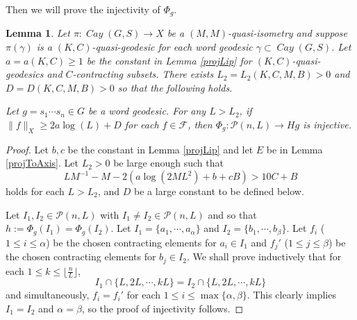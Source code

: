 \documentclass{amsart}
\numberwithin{thm}{section}
\numberwithin{figure}{section}
\newtheorem{lem}[thm]{Lemma}
\theoremstyle{definition}
\theoremstyle{definition}
\theoremstyle{remark}
\numberwithin{equation}{section}
\DeclareMathOperator{\Cay}{\mathit{Cay}}
\theoremstyle{plain}
\begin{document}
Then we will prove the injectivity of $\Phi_g$.
\begin{lem}\label{extInj}
	Let $\pi: \Cay (G, S)\to X$ be a $(M, M)$-quasi-isometry and suppose $\pi(\gamma)$ is a $(K, C)$-quasi-geodesic for each word geodesic $\gamma\subset \Cay (G,S)$.
    Let $a=a(K,C)\ge 1$ be the constant in Lemma \ref{projLip} for $(K, C)$-quasi-geodesics and $C$-contracting subsets. There exists $L_2 = L_2(K, C, M, B)>0$ and $D = D(K, C, M, B) > 0$ so that the following holds.
	
	Let $g = s_1 \cdots s_n\in G$ be a word geodesic. For any $L>L_2$, if $\|f\|_X \ge 2a\log (L) + D$ for each $f\in \mathcal{F}$, then $\Phi_g: \mathcal{P}(n,L)\to Hg$ is injective.
\end{lem}
\begin{proof}
	Let $b, c$ be the constant in Lemma \ref{projLip} and let $E$ be in Lemma \ref{projToAxis}. Let $L_2>0$ be large enough such that $$LM^{-1} - M - 2(a\log (2ML^2) + b + cB) > 10 C + B$$ holds for each $L > L_2$, and $D$ be a large constant to be defined below. 
	
	Let $I_1, I_2 \in \mathcal{P}(n, L)$ with $I_1\ne I_2\in \mathcal{P}(n,L)$ and so that $h := \Phi_g(I_1) = \Phi_g(I_2)$. Let $I_1 = \{a_1, \cdots, a_{\alpha}\}$ and $I_2 = \{b_1, \cdots, b_{\beta}\}$. Let $f_i$ ($1\le i\le \alpha$) be the chosen contracting elements for $a_i\in I_1$ and $f_j'$ ($1\le j\le \beta$) be the chosen contracting elements for $b_j\in I_2$. We shall prove inductively that for each $1\le k\le \lfloor\frac{n}{L}\rfloor$, $$I_1 \cap \{L, 2L, \cdots, kL\} = I_2 \cap \{L, 2L, \cdots, kL\}$$ and simultaneously, $f_i = f_i'$ for each $1\le i\le \max\{\alpha,\beta\}$. This clearly    implies $I_1=I_2$ and $\alpha = \beta$, so the proof of injectivity follows.
	

\end{proof}
\end{document}
